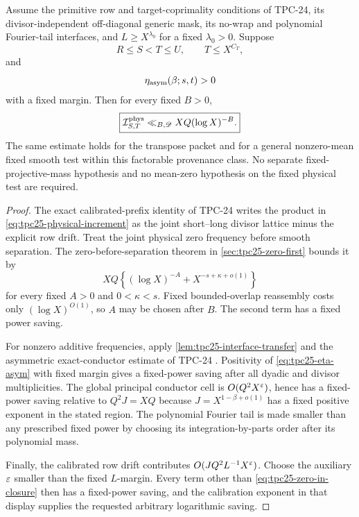 \begin{theorem}
\label{thm:tpc25-actual-one-sided-closure}
Assume the primitive row and target-coprimality conditions of TPC-24,
its divisor-independent off-diagonal generic mask, its no-wrap and
polynomial Fourier-tail interfaces, and \(L\ge X^{\lambda_0}\) for a
fixed \(\lambda_0>0\).  Suppose
\begin{equation}
 R\le S<T\le U,\qquad T\le X^{C_T},
 \label{eq:tpc25-shell-range}
\end{equation}
and
\begin{equation}
 \eta_{\rm asym}(\beta;s,t)>0
 \label{eq:tpc25-positive-conductor-margin}
\end{equation}
with a fixed margin.  Then for every fixed \(B>0\),
\begin{equation}
 \boxed{
 \mathcal I^{\rm phys}_{S,T}
 \ll_{B,\mathscr D}XQ(\log X)^{-B}.}
 \label{eq:tpc25-actual-closure}
\end{equation}
The same estimate holds for the transpose packet and for a general
nonzero-mean fixed smooth test within this factorable provenance
class.  No separate fixed-projective-mass hypothesis and no mean-zero
hypothesis on the fixed physical test are required.
\end{theorem}

\begin{proof}
The exact calibrated-prefix identity of TPC-24 writes the product in
\eqref{eq:tpc25-physical-increment} as the joint short--long divisor
lattice minus the explicit row drift.  Treat the joint physical zero
frequency before smooth separation.  The zero-before-separation
theorem in \cref{sec:tpc25-zero-first} bounds it by
\begin{equation}
 XQ\left\{(\log X)^{-A}
       +X^{-s+\kappa+o(1)}\right\}
 \label{eq:tpc25-zero-in-closure}
\end{equation}
for every fixed \(A>0\) and \(0<\kappa<s\).  Fixed bounded-overlap
reassembly costs only \((\log X)^{O(1)}\), so \(A\) may be chosen
after \(B\).  The second term has a fixed power saving.

For nonzero additive frequencies, apply
\cref{lem:tpc25-interface-transfer} and the asymmetric exact-conductor
estimate of TPC-24 \citep{WangTPC24}.  Positivity of
\eqref{eq:tpc25-eta-asym} with fixed margin gives a fixed-power saving
after all dyadic and divisor multiplicities.  The global principal
conductor cell is \(O(Q^2X^\varepsilon)\), hence has a fixed-power saving
relative to \(Q^2J=XQ\) because \(J=X^{1-\beta+o(1)}\) has a fixed
positive exponent in the stated region.  The polynomial Fourier tail
is made smaller than any prescribed fixed power by choosing its
integration-by-parts order after its polynomial mass.

Finally, the calibrated row drift contributes
\(O(JQ^2L^{-1}X^\varepsilon)\).  Choose the auxiliary \(\varepsilon\) smaller than
the fixed \(L\)-margin.  Every term other than
\eqref{eq:tpc25-zero-in-closure} then has a fixed-power saving, and the
calibration exponent in that display supplies the requested arbitrary
logarithmic saving.
\end{proof}

